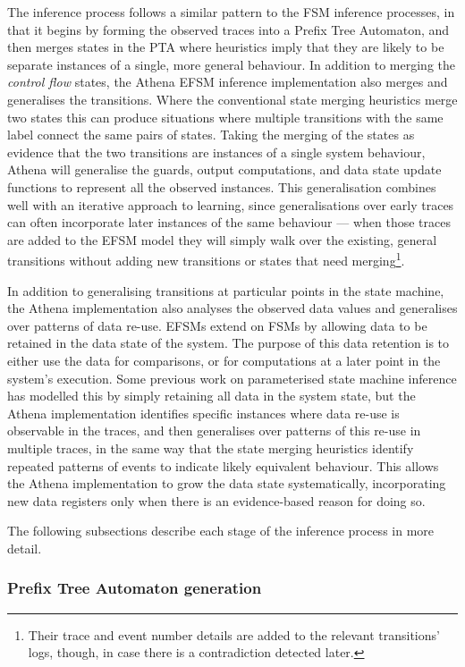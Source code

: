 The inference process follows a similar pattern to the FSM inference processes, in that it begins by forming the observed traces into a Prefix Tree Automaton, and then merges states in the PTA where heuristics imply that they are likely to be separate instances of a single, more general behaviour. In addition to merging the \emph{control flow} states, the Athena EFSM inference implementation also merges and generalises the transitions. Where the conventional state merging heuristics merge two states this can produce situations where multiple transitions with the same label connect the same pairs of states. Taking the merging of the states as evidence that the two transitions are instances of a single system behaviour, Athena will generalise the guards, output computations, and data state update functions to represent all the observed instances. This generalisation combines well with an iterative approach to learning, since generalisations over early traces can often incorporate later instances of the same behaviour --- when those traces are added to the EFSM model they will simply walk over the existing, general transitions without adding new transitions or states that need merging\footnote{Their trace and event number details are added to the relevant transitions' logs, though, in case there is a contradiction detected later.}.

In addition to generalising transitions at particular points in the state machine, the Athena implementation also analyses the observed data values and generalises over patterns of data re-use. EFSMs extend on FSMs by allowing data to be retained in the data state of the system. The purpose of this data retention is to either use the data for comparisons, or for computations at a later point in the system's execution. Some previous work on parameterised state machine inference has modelled this by simply retaining all data in the system state, but the Athena implementation identifies specific instances where data re-use is observable in the traces, and then generalises over patterns of this re-use in multiple traces, in the same way that the state merging heuristics identify repeated patterns of events to indicate likely equivalent behaviour. This allows the Athena implementation to grow the data state systematically, incorporating new data registers only when there is an evidence-based reason for doing so.

The following subsections describe each stage of the inference process in more detail.

\subsubsection{Prefix Tree Automaton generation}
\label{PTA}

